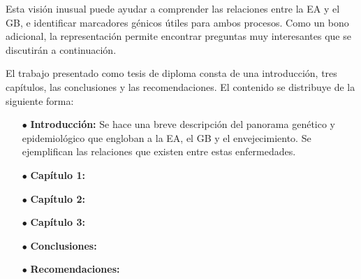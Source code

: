 Esta visión inusual puede ayudar a comprender las relaciones entre la EA y el GB, e identificar marcadores génicos útiles para ambos procesos. Como un bono adicional, la representación permite encontrar preguntas muy interesantes que se discutirán a continuación.

\alert{El trabajo presentado como tesis de diploma consta de una introducción, tres capítulos, las conclusiones y las recomendaciones. El contenido se distribuye de la siguiente forma:}

\begin{itemize}
	\item[$\bullet$] \textbf{Introducción:} Se hace una breve descripción del panorama genético y epidemiológico que engloban a la EA, el GB y el envejecimiento. Se ejemplifican las relaciones que existen entre estas enfermedades.
	
	\item[$\bullet$] \textbf{Capítulo 1:} 
	
	\item[$\bullet$] \textbf{Capítulo 2:} 
	
	\item[$\bullet$] \textbf{Capítulo 3:} 
	
	\item[$\bullet$] \textbf{Conclusiones:} 
	
	\item[$\bullet$] \textbf{Recomendaciones:} 
	
	
\end{itemize}